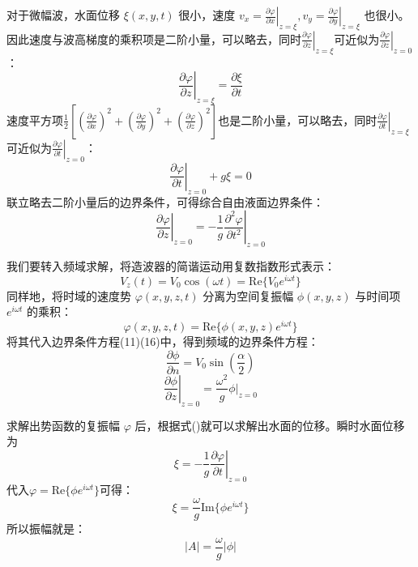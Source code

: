 \documentclass[11pt,a4paper]{ctexart}
\begin{document}
对于微幅波，水面位移 $\xi(x,y,t)$ 很小，速度 $v_x=\left. \frac{\partial \varphi}{\partial x} \right|_{z=\xi},v_y=\left. \frac{\partial \varphi}{\partial y} \right|_{z=\xi}$ 也很小。因此速度与波高梯度的乘积项是二阶小量，可以略去，同时$\left. \frac{\partial \varphi}{\partial z} \right|_{z=\xi}$可近似为$\left. \frac{\partial \varphi}{\partial z} \right|_{z=0}$：
\begin{equation}
    \left. \frac{\partial \varphi}{\partial z} \right|_{z=\xi} = \frac{\partial \xi}{\partial t}
\end{equation}
速度平方项$\frac{1}{2} \left[ \left( \frac{\partial \varphi}{\partial x} \right)^2 + \left( \frac{\partial \varphi}{\partial y} \right)^2 + \left( \frac{\partial \varphi}{\partial z} \right)^{2}\right]$也是二阶小量，可以略去，同时$\left. \frac{\partial \varphi}{\partial t} \right|_{z=\xi}$可近似为$\left. \frac{\partial \varphi}{\partial t} \right|_{z=0}$：
\begin{equation}
    \left. \frac{\partial \varphi}{\partial t} \right|_{z=0} + g\xi = 0 
\end{equation}
联立略去二阶小量后的边界条件，可得综合自由液面边界条件：
\begin{equation}
    \left. \frac{\partial \varphi}{\partial z} \right|_{z=0} = -\frac{1}{g}\left.\frac{\partial^2 \varphi}{\partial t^2}\right|_{z=0}
\end{equation}

我们要转入频域求解，将造波器的简谐运动用复数指数形式表示：
\begin{equation}
    V_z(t) = V_0 \cos(\omega t) = \text{Re}\{V_0 e^{i\omega t}\}
\end{equation}
同样地，将时域的速度势 $\varphi(x,y,z,t)$ 分离为空间复振幅 $\phi(x,y,z)$ 与时间项 $e^{i\omega t}$ 的乘积：
\begin{equation}
    \varphi(x,y,z,t) = \text{Re}\{\phi(x,y,z) e^{i\omega t}\}
\end{equation}
将其代入边界条件方程(11)(16)中，得到频域的边界条件方程：
\begin{equation}
    \frac{\partial \phi}{\partial n} = V_0\sin(\frac{\alpha}{2})
\end{equation}
\begin{equation}
    \left. \frac{\partial \phi}{\partial z} \right|_{z=0} = \frac{\omega^2}{g} \phi|_{z=0}
\end{equation}

求解出势函数的复振幅 $\varphi$ 后，根据式()就可以求解出水面的位移。瞬时水面位移为
\begin{equation}
    \xi = -\frac{1}{g}\left.\frac{\partial \varphi}{\partial t}\right|_{z=0}
\end{equation}
代入$\varphi = \text{Re}\{ \phi e^{i\omega t} \}$可得：
\begin{equation}
    \xi = \frac{\omega}{g} \text{Im}\{ \phi e^{i\omega t} \}
\end{equation}
所以振幅就是：
\begin{equation}
    \vert{}A\vert{} = \frac{\omega}{g} \vert{}\phi\vert{}
\end{equation}
\end{document}
